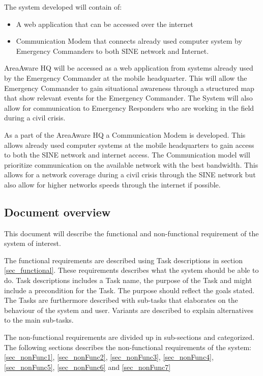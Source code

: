 The system developed will contain of:
\begin{itemize}
	\item A web application that can be accessed over the internet
	\item Communication Modem that connects already used computer system by Emergency Commanders to both SINE network and Internet.
\end{itemize}

AreaAware HQ will be accessed as a web application from systems already used by the Emergency Commander at the mobile headquarter. This will allow the Emergency Commander to gain situational awareness through a structured map that show relevant events for the Emergency Commander. The System will also allow for communication to Emergency Responders who are working in the field during a civil crisis.

As a part of the AreaAware HQ a Communication Modem is developed. This allows already used computer systems at the mobile headquarters to gain access to both the SINE network and internet access. The Communication model will prioritize communication on the available network with the best bandwidth. This allows for a network coverage during a civil crisis through the SINE network but also allow for higher networks speeds through the internet if possible.

\subsection{Document overview}
\label{sec_documentOverview}
This document will describe the functional and non-functional requirement of the system of interest. 

The functional requirements are described using Task descriptions in section \ref{sec_functional}. These requirements describes what the system should be able to do. Task descriptions includes a Task name, the purpose of the Task and might include a precondition for the Task. The purpose should reflect the goals stated. The Tasks are furthermore described with sub-tasks that elaborates on the behaviour of the system and user.  Variants are described to explain alternatives to the main sub-tasks. \citep{taskDescription}

The non-functional requirements are divided up in sub-sections and categorized. The following sections describes the non-functional requirements of the system: \ref{sec_nonFunc1}, \ref{sec_nonFunc2}, \ref{sec_nonFunc3}, \ref{sec_nonFunc4}, \ref{sec_nonFunc5}, \ref{sec_nonFunc6} and \ref{sec_nonFunc7} 
 

